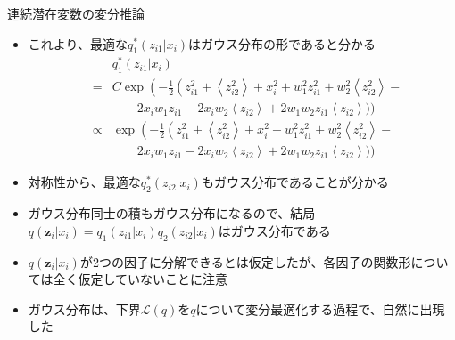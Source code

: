 \documentclass[dvipdfmx,notheorems,t]{beamer}
\begin{document}
\begin{frame}{連続潜在変数の変分推論}
\begin{itemize}
\begin{itemize}
		\item これより、最適な$q_1^*(z_{i1} | x_i)$は\alert{ガウス分布}の形であると分かる
		\begin{eqnarray}
			&& q_1^*(z_{i1} | x_i) \nonumber \\
			&=& C \exp \left( -\frac{1}{2} \left( z_{i1}^2 + \left< z_{i2}^2 \right> + x_i^2 + w_1^2 z_{i1}^2 + w_2^2 \left< z_{i2}^2 \right> - \right. \right. \nonumber \\
			&& \qquad 2 x_i w_1 z_{i1} - 2 x_i w_2 \left< z_{i2} \right> + 2 w_1 w_2 z_{i1} \left< z_{i2} \right> \big) \bigg) \nonumber \\
			&\propto& \exp \left( -\frac{1}{2} \left( z_{i1}^2 + \left< z_{i2}^2 \right> + x_i^2 + w_1^2 z_{i1}^2 + w_2^2 \left< z_{i2}^2 \right> - \right. \right. \nonumber \\
			&& \qquad 2 x_i w_1 z_{i1} - 2 x_i w_2 \left< z_{i2} \right> + 2 w_1 w_2 z_{i1} \left< z_{i2} \right> \big) \bigg)
		\end{eqnarray}
		
		\item 対称性から、最適な$q_2^*(z_{i2} | x_i)$も\alert{ガウス分布}であることが分かる
		\newline
		
		\item ガウス分布同士の積もガウス分布になるので、結局$q(\bm{z}_i | x_i) = q_1(z_{i1} | x_i) q_2(z_{i2} | x_i)$はガウス分布である
		\item $q(\bm{z}_i | x_i)$が2つの因子に分解できるとは仮定したが、\alert{各因子の関数形については全く仮定していない}ことに注意
		\item ガウス分布は、下界$\mathcal{L}(q)$を$q$について変分最適化する過程で、\alert{自然に出現した}
	\end{itemize}
\end{itemize}

\end{frame}
\end{document}
